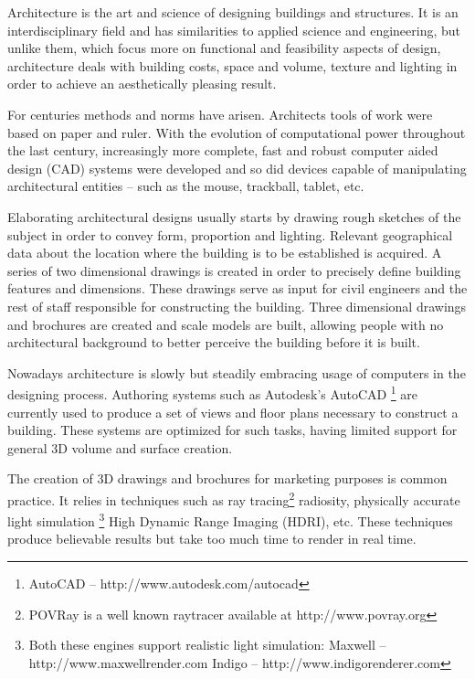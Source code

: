 
Architecture is the art and science of designing buildings and structures.
It is an interdisciplinary field and has similarities to applied science and
engineering, but unlike them, which focus more on functional and feasibility aspects of design, 
architecture deals with building costs, space and volume, texture and lighting
in order to achieve an aesthetically pleasing result.

For centuries methods and norms have arisen. Architects tools of work were based on paper and ruler.
With the evolution of computational power throughout the last century, 
increasingly more complete, fast and robust computer aided design (CAD) systems were developed and so did
devices capable of manipulating architectural entities -- such as the mouse, trackball, tablet, etc.

Elaborating architectural designs usually starts by drawing rough sketches of the subject
in order to convey form, proportion and lighting. Relevant geographical data about the location
where the building is to be established is acquired. A series of two dimensional drawings is created
in order to precisely define building features and dimensions.
These drawings serve as input for civil engineers and the rest of staff responsible for constructing the building.
Three dimensional drawings and brochures are created and scale models are built, allowing
people with no architectural background to better perceive the building before it is built.

Nowadays architecture is slowly but steadily embracing usage of computers in the designing process.
Authoring systems such as Autodesk's AutoCAD
\footnote{AutoCAD -- http://www.autodesk.com/autocad}%
are currently used to produce a set of views and floor plans necessary to construct a building.
These systems are optimized for such tasks, having limited support for general 3D volume and surface creation.

The creation of 3D drawings and brochures for marketing purposes is common practice.
It relies in techniques such as
ray tracing\footnote{POVRay is a well known raytracer available at http://www.povray.org}%
radiosity,
physically accurate light simulation
\footnote{Both these engines support realistic light simulation:
Maxwell -- http://www.maxwellrender.com%
Indigo -- http://www.indigorenderer.com%
}
High Dynamic Range Imaging (HDRI), etc.
These techniques produce believable results but take too much time to render in real time.

